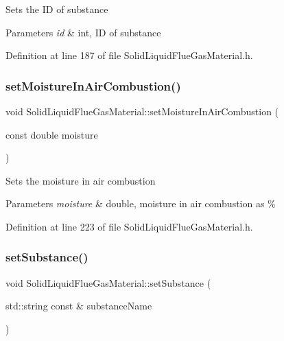 Sets the ID of substance 
\begin{DoxyParams}{Parameters}
{\em id} & int, ID of substance \\
\hline
\end{DoxyParams}


Definition at line 187 of file Solid\+Liquid\+Flue\+Gas\+Material.\+h.

\mbox{\label{class_solid_liquid_flue_gas_material_a1a5f1bd3008e78cce62edb8aca642284}} 
\subsubsection{\texorpdfstring{set\+Moisture\+In\+Air\+Combustion()}{setMoistureInAirCombustion()}}
{\footnotesize\ttfamily void Solid\+Liquid\+Flue\+Gas\+Material\+::set\+Moisture\+In\+Air\+Combustion (\begin{DoxyParamCaption}\item[{const double}]{moisture }\end{DoxyParamCaption})\hspace{0.3cm}{\ttfamily [inline]}}

Sets the moisture in air combustion 
\begin{DoxyParams}{Parameters}
{\em moisture} & double, moisture in air combustion as \% \\
\hline
\end{DoxyParams}


Definition at line 223 of file Solid\+Liquid\+Flue\+Gas\+Material.\+h.

\mbox{\label{class_solid_liquid_flue_gas_material_a54be915432c1300c4d8eaf7bf2be361f}} 
\subsubsection{\texorpdfstring{set\+Substance()}{setSubstance()}}
{\footnotesize\ttfamily void Solid\+Liquid\+Flue\+Gas\+Material\+::set\+Substance (\begin{DoxyParamCaption}\item[{std\+::string const \&}]{substance\+Name }\end{DoxyParamCaption})\hspace{0.3cm}{\ttfamily [inline]}}

